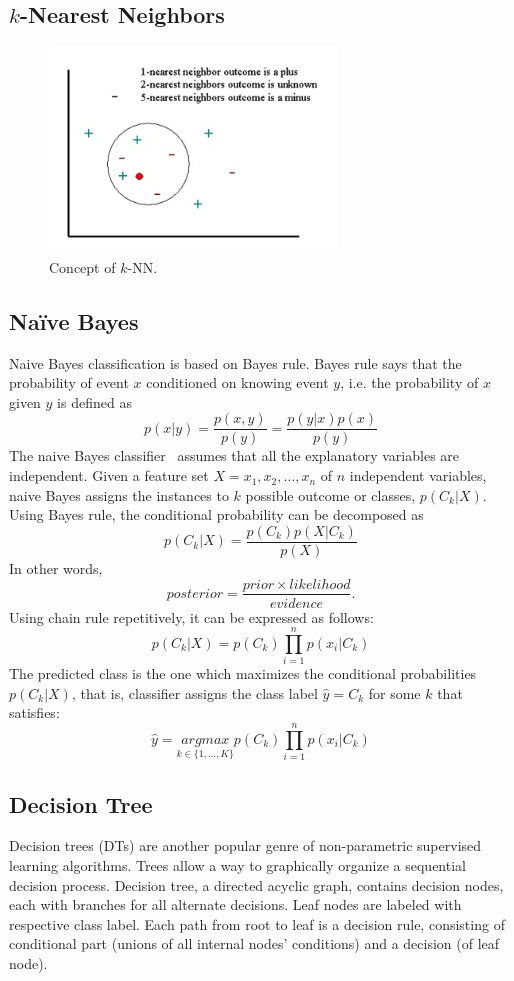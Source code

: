 \documentclass[a4paper, 11pt, oneside]{book}
\begin{document}
\subsection{$k$-Nearest Neighbors}
\begin{figure}[htbp]
    \begin{center}
        \includegraphics[width=3.0in]{figs/knn.jpg}
        \caption{Concept of $k$-NN.}
        \label{fig:bg:knn}
    \end{center}
\end{figure}

\subsection{Na\"ive Bayes}
Naive Bayes classification is based on Bayes rule. Bayes rule says that the probability of event $x$ conditioned on knowing event $y$, i.e. the probability of $x$ given $y$ is defined as
\[
    p(x|y) = \frac{p(x,y)}{p(y)} = \frac{p(y|x) p(x)}{p(y)}
\]
The naive Bayes classifier~\cite{langley92:nb} assumes that all the explanatory variables are independent. Given a feature set $X = x_1, x_2, \dots, x_n$ of $n$ independent variables, naive Bayes assigns the instances to $k$ possible outcome or classes, $p(C_k | X)$. Using Bayes rule, the conditional probability can be decomposed as
\[
    p(C_k |X) = \frac{p(C_k) p(X|C_k)}{p(X)}
\]
In other words,
\[
    posterior = \frac{prior \times likelihood}{evidence}.
\]
Using chain rule repetitively, it can be expressed as follows:
\[
    p(C_k |X) = p(C_k) \prod_{i=1}^n p(x_i | C_k)
\]
The predicted class is the one which maximizes the conditional probabilities $p(C_k|X)$, that is, classifier assigns the class label $\hat{y} = C_k$ for some $k$ that satisfies:
\[
    \hat{y} = \underset{k \in \{1, \dots, K\}}{argmax}  p(C_k) \prod_{i=1}^n p(x_i | C_k)
\]

\subsection{Decision Tree}
Decision trees (DTs) are another popular genre of non-parametric supervised learning algorithms. Trees allow a way to graphically organize a sequential decision process. Decision tree, a directed acyclic graph, contains decision nodes, each with branches for all alternate decisions. Leaf nodes are labeled with respective class label. Each path from root to leaf is a decision rule, consisting of conditional part (unions of all internal nodes' conditions) and a decision (of leaf node).
\end{document}
